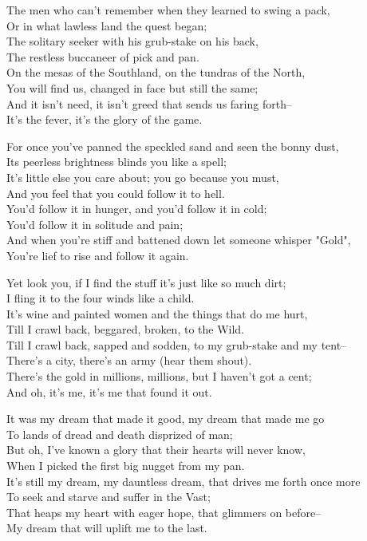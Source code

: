\begin{poemblock}
The men who can't remember when they learned to swing a pack,\\
\idt Or in what lawless land the quest began;\\
The solitary seeker with his grub-stake on his back,\\
\idt The restless buccaneer of pick and pan.\\
On the mesas of the Southland, on the tundras of the North,\\
\idt You will find us, changed in face but still the same;\\
And it isn't need, it isn't greed that sends us faring forth--\\
\idt It's the fever, it's the glory of the game.

For once you've panned the speckled sand and seen the bonny dust,\\
\idt Its peerless brightness blinds you like a spell;\\
It's little else you care about; you go because you must,\\
\idt And you feel that you could follow it to hell.\\
You'd follow it in hunger, and you'd follow it in cold;\\
\idt You'd follow it in solitude and pain;\\
And when you're stiff and battened down let someone whisper "Gold",\\
\idt You're lief to rise and follow it again.

Yet look you, if I find the stuff it's just like so much dirt;\\
\idt I fling it to the four winds like a child.\\
It's wine and painted women and the things that do me hurt,\\
\idt Till I crawl back, beggared, broken, to the Wild.\\
Till I crawl back, sapped and sodden, to my grub-stake and my tent--\\
\idt There's a city, there's an army (hear them shout).\\
There's the gold in millions, millions, but I haven't got a cent;\\
\idt And oh, it's me, it's me that found it out.

It was my dream that made it good, my dream that made me go\\
\idt To lands of dread and death disprized of man;\\
But oh, I've known a glory that their hearts will never know,\\
\idt When I picked the first big nugget from my pan.\\
It's still my dream, my dauntless dream, that drives me forth once more\\
\idt To seek and starve and suffer in the Vast;\\
That heaps my heart with eager hope, that glimmers on before--\\
\idt My dream that will uplift me to the last.


\end{poemblock}
